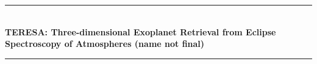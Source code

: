 \documentclass[12pt]{article}
\begin{document}
\begin{titlepage} %
	\newcommand{\HRule}{\rule{\linewidth}{0.5mm}} %
	
	\center %
	
	
	
	
	
	
	\HRule\\[0.4cm]
	
	{\huge\bfseries TERESA: Three-dimensional Exoplanet Retrieval from Eclipse Spectroscopy of Atmospheres (name not final)}\\[0.4cm] %
	
	\HRule\\[1.5cm]
	
	
	

\end{titlepage}
\end{document}

